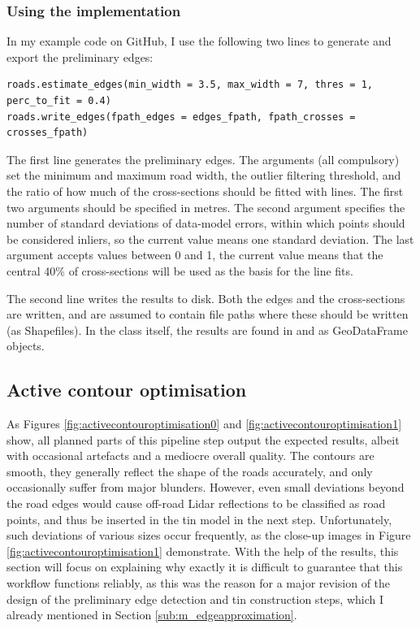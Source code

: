 \subsubsection{Using the implementation}

In my example code on GitHub, I use the following two lines to generate and export the preliminary edges:

\begin{verbatim}
roads.estimate_edges(min_width = 3.5, max_width = 7, thres = 1, perc_to_fit = 0.4)
roads.write_edges(fpath_edges = edges_fpath, fpath_crosses = crosses_fpath)
\end{verbatim}

The first line generates the preliminary edges. The arguments (all compulsory) set the minimum and maximum road width, the outlier filtering threshold, and the ratio of how much of the cross-sections should be fitted with lines. The first two arguments should be specified in metres. The second argument specifies the number of standard deviations of data-model errors, within which points should be considered inliers, so the current value means one standard deviation. The last argument accepts values between 0 and 1, the current value means that the central 40\% of cross-sections will be used as the basis for the line fits.

The second line writes the results to disk. Both the edges and the cross-sections are written,  and  are assumed to contain file paths where these should be written (as Shapefiles). In the class itself, the results are found in  and  as GeoDataFrame objects.

\subsection{Active contour optimisation}
\label{sub:r_activecontours}

As Figures \ref{fig:activecontouroptimisation0} and \ref{fig:activecontouroptimisation1} show, all planned parts of this pipeline step output the expected results, albeit with occasional artefacts and a mediocre overall quality. The contours are smooth, they generally reflect the shape of the roads accurately, and only occasionally suffer from major blunders. However, even small deviations beyond the road edges would cause off-road Lidar reflections to be classified as road points, and thus be inserted in the \ac{tin} model in the next step. Unfortunately, such deviations of various sizes occur frequently, as the close-up images in Figure \ref{fig:activecontouroptimisation1} demonstrate. With the help of the results, this section will focus on explaining why exactly it is difficult to guarantee that this workflow functions reliably, as this was the reason for a major revision of the design of the preliminary edge detection and \ac{tin} construction steps, which I already mentioned in Section \ref{sub:m_edgeapproximation}.

